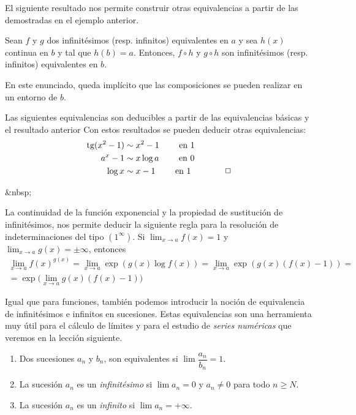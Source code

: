 El siguiente resultado nos permite construir otras equivalencias a partir de las demostradas en el ejemplo anterior.
% 
\begin{teorema}
Sean $f$ y $g$ dos infinitésimos (resp. infinitos) equivalentes en $a$
y sea $h(x)$ continua en $b$ y tal que $h(b)=a$. Entonces, $f\circ h$
y $g\circ h$ son infinitésimos (resp. infinitos) equivalentes en $b$.
\end{teorema}
%
En este enunciado, queda implícito que las composiciones se pueden realizar en un entorno de $b$.
\begin{ejemplo}
Las siguientes equivalencias son deducibles a partir de las equivalencias básicas y el resultado anterior
Con estos resultados se pueden deducir otras equivalencias:
\begin{align*}
\operatorname{tg} (x^2-1) & \sim x^2-1 \qquad\hbox{ en 1}\\
a^x-1  & \sim x\log a \qquad\hbox{ en 0}\\
\log x & \sim x-1 \qquad\hbox{ en 1}\tag*{\fej}
\end{align*}
\end{ejemplo}
\begin{rawhtml}
&nbsp;
\end{rawhtml}
\begin{ejemplo}
La continuidad de la función exponencial y la propiedad de sustitución de infinitésimos, nos permite deducir la siguiente regla para la resolución de indeterminaciones del tipo $(1^\infty)$.
Si $\displaystyle\lim_{x\to a}f(x)=1$ y $\displaystyle\lim_{x\to a}g(x)=\pm\infty$, entonces
\begin{multline*}
\lim_{x\to a}f(x)^{g(x)} = \lim_{x\to a} \exp(g(x)\log f(x)) = \lim_{x\to a} \exp(g(x)(f(x)-1))=\\
 = \exp\Big(\lim_{x\to a} g(x)(f(x)-1)\Big)\tag*{\fej}
\end{multline*}
\end{ejemplo}


Igual que para funciones, también podemos introducir la noción de equivalencia de infinitésimos e infinitos 
en sucesiones.
Estas equivalencias son una herramienta muy útil para el cálculo de límites y para el estudio de \emph{series numéricas} que veremos en la lección siguiente.
%
\begin{definicion-br}
\begin{enumerate}
\item
Dos sucesiones $a_n$ y $b_n$, son equivalentes si $\lim\dfrac{a_n}{b_n}=1$.
\item
La sucesión $a_n$ es un \emph{infinitésimo} si $\lim a_n=0$ y $a_n\neq 0$ para todo $n\geq N$.
\item
La sucesión $a_n$ es un \emph{infinito} si $\lim a_n=+\infty$.
\end{enumerate}
\end{definicion-br}

